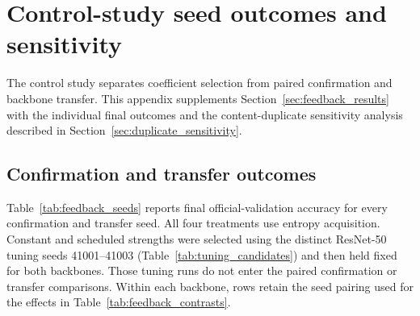 \documentclass[10pt,a4paper,twocolumn]{article}
\begin{document}
\section{Control-study seed outcomes and sensitivity}
\label{app:feedback_details}

The control study separates coefficient selection from paired
confirmation and backbone transfer. This appendix supplements
Section~\ref{sec:feedback_results} with the individual final outcomes
and the content-duplicate sensitivity analysis described in
Section~\ref{sec:duplicate_sensitivity}.

\subsection{Confirmation and transfer outcomes}
\label{app:control_seed_values}

Table~\ref{tab:feedback_seeds} reports final official-validation
accuracy for every confirmation and transfer seed. All four treatments
use entropy acquisition. Constant and scheduled strengths were selected
using the distinct ResNet-50 tuning seeds 41001--41003
(Table~\ref{tab:tuning_candidates}) and then held fixed for both
backbones. Those tuning runs do not enter the paired confirmation or
transfer comparisons. Within each backbone, rows retain the seed
pairing used for the effects in Table~\ref{tab:feedback_contrasts}.
\end{document}
